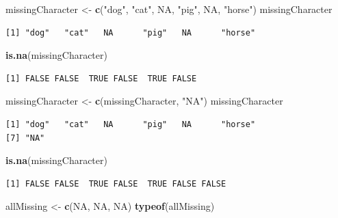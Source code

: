 \documentclass[
]{krantz}
\makeatletter
\newenvironment{Shaded}{\begin{snugshade}}{\end{snugshade}}
\newcommand{\KeywordTok}[1]{\textcolor[rgb]{0.27,0.27,0.27}{\textbf{#1}}}
\newcommand{\NormalTok}[1]{#1}
\newcommand{\OtherTok}[1]{\textcolor[rgb]{0.37,0.37,0.37}{#1}}
\newcommand{\StringTok}[1]{\textcolor[rgb]{0.5,0.5,0.5}{#1}}
\newenvironment{kframe}{%
\medskip{}
\setlength{\fboxsep}{.8em}
 \def\at@end@of@kframe{}%
 \ifinner\ifhmode%
  \def\at@end@of@kframe{\end{minipage}}%
  \begin{minipage}{\columnwidth}%
 \fi\fi%
 \def\FrameCommand##1{\hskip\@totalleftmargin \hskip-\fboxsep
 \colorbox{shadecolor}{##1}\hskip-\fboxsep
     \hskip-\linewidth \hskip-\@totalleftmargin \hskip\columnwidth}%
 \MakeFramed {\advance\hsize-\width
   \@totalleftmargin\z@ \linewidth\hsize
   \@setminipage}}%
 {\par\unskip\endMakeFramed%
 \at@end@of@kframe}
\renewenvironment{Shaded}{\begin{kframe}}{\end{kframe}}
\makeatother
\begin{document}
\begin{Shaded}
\begin{Highlighting}[]
\NormalTok{missingCharacter \textless{}{-}}\StringTok{ }\KeywordTok{c}\NormalTok{(}\StringTok{"dog"}\NormalTok{, }\StringTok{"cat"}\NormalTok{, }\OtherTok{NA}\NormalTok{, }\StringTok{"pig"}\NormalTok{, }\OtherTok{NA}\NormalTok{, }\StringTok{"horse"}\NormalTok{)}
\NormalTok{missingCharacter}
\end{Highlighting}
\end{Shaded}

\begin{verbatim}
[1] "dog"   "cat"   NA      "pig"   NA      "horse"
\end{verbatim}

\begin{Shaded}
\begin{Highlighting}[]
\KeywordTok{is.na}\NormalTok{(missingCharacter)}
\end{Highlighting}
\end{Shaded}

\begin{verbatim}
[1] FALSE FALSE  TRUE FALSE  TRUE FALSE
\end{verbatim}

\begin{Shaded}
\begin{Highlighting}[]
\NormalTok{missingCharacter \textless{}{-}}\StringTok{ }\KeywordTok{c}\NormalTok{(missingCharacter, }\StringTok{"NA"}\NormalTok{)}
\NormalTok{missingCharacter}
\end{Highlighting}
\end{Shaded}

\begin{verbatim}
[1] "dog"   "cat"   NA      "pig"   NA      "horse"
[7] "NA"   
\end{verbatim}

\begin{Shaded}
\begin{Highlighting}[]
\KeywordTok{is.na}\NormalTok{(missingCharacter)}
\end{Highlighting}
\end{Shaded}

\begin{verbatim}
[1] FALSE FALSE  TRUE FALSE  TRUE FALSE FALSE
\end{verbatim}

\begin{Shaded}
\begin{Highlighting}[]
\NormalTok{allMissing \textless{}{-}}\StringTok{ }\KeywordTok{c}\NormalTok{(}\OtherTok{NA}\NormalTok{, }\OtherTok{NA}\NormalTok{, }\OtherTok{NA}\NormalTok{)}
\KeywordTok{typeof}\NormalTok{(allMissing)}
\end{Highlighting}
\end{Shaded}
\end{document}
